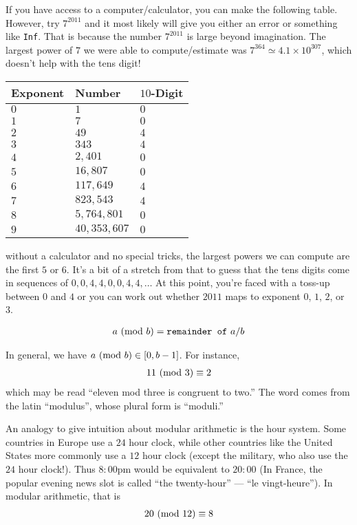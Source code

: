 \documentclass[12pt]{article}
\begin{document}
If you have access to a computer/calculator, you can make the following table. However, try $7^{2011}$ and it most likely will give you either an error or something like \texttt{Inf}. That is because the number $7^{2011}$ is large beyond imagination. The largest power of $7$ we were able to compute/estimate was $7^{364} \simeq 4.1 \times 10^{307}$, which doesn't help with the tens digit!
\begin{center}
\begin{tabular}{lll}
    \hline
    Exponent  &  Number &  $10$-Digit \\
    \hline
    $0$  &  $1$ &  $0$ \\
    $1$  &  $7$ &  $0$ \\
    $2$  &  $49$ &  $4$ \\
    $3$  &  $343$ &  $4$ \\
    $4$  &  $2,401$ &  $0$ \\
    $5$  &  $16,807$ &  $0$ \\
    $6$  &  $117,649$ &  $4$ \\
    $7$  &  $823,543$ &  $4$ \\
    $8$  &  $5,764,801$ &  $0$ \\
    $9$  &  $40,353,607$ &  $0$ \\
    \hline
    \end{tabular}
\end{center}
without a calculator and no special tricks, the largest powers we can compute are the first $5$ or $6$. It's a bit of a stretch from that to guess that the tens digits come in sequences of $0,0,4,4,0,0,4,4,\ldots$ At this point, you're faced with a toss-up between $0$ and $4$ or you can work out whether $2011$ maps to exponent $0$, $1$, $2$, or $3$.

\begin{definition*}
\begin{align*}
a\ (\mathrm{mod}\ b) = \texttt{remainder of}~a/b
\end{align*}
\end{definition*}
In general, we have $a\ (\mathrm{mod}\ b)\in[0,b-1]$. For instance, 
\begin{align*}
11\ (\mathrm{mod}\ 3) \equiv 2
\end{align*}
which may be read ``eleven mod three is congruent to two.'' The word comes from the latin ``modulus'', whose plural form is ``moduli.'' 

An analogy to give intuition about modular arithmetic is the hour system. Some countries in Europe use a $24$ hour clock, while other countries like the United States more commonly use a $12$ hour clock (except the military, who also use the $24$ hour clock!). Thus $8{:}00$pm would be equivalent to $20{:}00$ (In France, the popular evening news slot is called ``the twenty-hour'' --- ``le vingt-heure''). In modular arithmetic, that is
\begin{align*}
20\ (\mathrm{mod}\ 12) \equiv 8
\end{align*}
\end{document}
